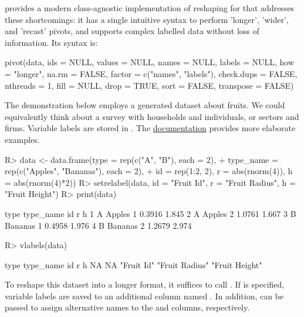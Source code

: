\documentclass[article]{jss}
\begin{document}
 provides a modern class-agnostic implementation of reshaping for  that addresses these shortcomings: it has a single intuitive syntax to perform 'longer', 'wider', and 'recast' pivots, and supports complex labelled data without loss of information. Its syntax is:
%
\begin{Code}
pivot(data, ids = NULL, values = NULL, names = NULL, labels = NULL,
  how = "longer", na.rm = FALSE, factor = c("names", "labels"),
  check.dups = FALSE, nthreads = 1, fill = NULL, drop = TRUE,
  sort = FALSE, transpose = FALSE)
\end{Code}
%
The demonstration below employs a generated dataset about fruits. We could equivalently think about a survey with households and individuals, or sectors and firms. Variable labels are stored in . The \href{https://sebkrantz.github.io/collapse/reference/pivot.html#ref-examples}{documentation} provides more elaborate examples.
%
\begin{Schunk}
\begin{Sinput}
R> data <- data.frame(type = rep(c("A", "B"), each = 2),
+    type_name = rep(c("Apples", "Bananas"), each = 2),
+    id = rep(1:2, 2), r = abs(rnorm(4)), h = abs(rnorm(4)*2))
R> setrelabel(data, id = "Fruit Id", r = "Fruit Radius", h = "Fruit Height")
R> print(data)
\end{Sinput}
\begin{Soutput}
  type type_name id      r     h
1    A    Apples  1 0.3916 1.845
2    A    Apples  2 1.0761 1.667
3    B   Bananas  1 0.4958 1.976
4    B   Bananas  2 1.2679 2.974
\end{Soutput}
\begin{Sinput}
R> vlabels(data)
\end{Sinput}
\begin{Soutput}
          type      type_name             id              r              h 
            NA             NA     "Fruit Id" "Fruit Radius" "Fruit Height" 
\end{Soutput}
\end{Schunk}
%
To reshape this dataset into a longer format, it suffices to call . If  is specified, variable labels are saved to an additional column named . In addition,  can be passed to assign alternative names to the  and  columns, respectively.
%
\end{document}
